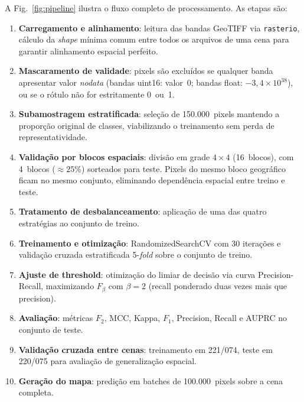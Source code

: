 \documentclass[conference]{IEEEtran}
\begin{document}
A Fig.~\ref{fig:pipeline} ilustra o fluxo completo de processamento.
As etapas são:

\begin{enumerate}
  \item \textbf{Carregamento e alinhamento}: leitura das bandas GeoTIFF via
        \texttt{rasterio}, cálculo da \textit{shape} mínima comum entre todos
        os arquivos de uma cena para garantir alinhamento espacial perfeito.
  \item \textbf{Mascaramento de validade}: pixels são excluídos se qualquer
        banda apresentar valor \textit{nodata} (bandas uint16: valor~0;
        bandas float: $-3{,}4 \times 10^{38}$), ou se o rótulo não for
        estritamente 0~ou~1.
  \item \textbf{Subamostragem estratificada}: seleção de 150.000~pixels
        mantendo a proporção original de classes, viabilizando o treinamento
        sem perda de representatividade.
  \item \textbf{Validação por blocos espaciais}: divisão em grade $4 \times 4$
        (16~blocos), com 4~blocos ($\approx25\%$) sorteados para teste.
        Pixels do mesmo bloco geográfico ficam no mesmo conjunto,
        eliminando dependência espacial entre treino e teste.
  \item \textbf{Tratamento de desbalanceamento}: aplicação de uma das quatro
        estratégias ao conjunto de treino.
  \item \textbf{Treinamento e otimização}: RandomizedSearchCV com 30
        iterações e validação cruzada estratificada 5-\textit{fold} sobre o
        conjunto de treino.
  \item \textbf{Ajuste de threshold}: otimização do limiar de decisão via
        curva Precision-Recall, maximizando $F_\beta$ com $\beta=2$
        (recall ponderado duas vezes mais que precision).
  \item \textbf{Avaliação}: métricas $F_2$, MCC, Kappa, $F_1$, Precision,
        Recall e AUPRC no conjunto de teste.
  \item \textbf{Validação cruzada entre cenas}: treinamento em 221/074,
        teste em 220/075 para avaliação de generalização espacial.
  \item \textbf{Geração do mapa}: predição em batches de 100.000~pixels
        sobre a cena completa.
\end{enumerate}
\end{document}
